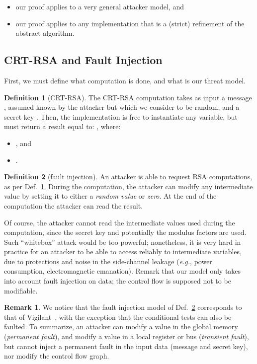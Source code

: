 \documentclass[10pt]{article}
\theoremstyle{definition}
\newtheorem{definition}{Definition}
\newtheorem{remark}{Remark}
\theoremstyle{theorem}
\newcommand{\eg}{\textit{e.g.}}
\begin{document}
\begin{itemize}
\item our proof applies to a very general attacker model, and
\item our proof applies to any implementation that is a (strict) refinement of the abstract algorithm.
\end{itemize}

\subsection{CRT-RSA and Fault Injection}
\label{sec-methods-rsa}

First, we must define what computation is done, and what is our threat model.

\begin{definition}[CRT-RSA]
The CRT-RSA computation takes as input a message ,
assumed known by the attacker but which we consider to be random,
and a secret key .
Then, the implementation is free to instantiate any variable, but must return a result equal to:
, where:
\begin{itemize}
\item , and
\item .
\end{itemize}
\label{def-crtrsa}
\end{definition}

\begin{definition}[fault injection]
An attacker is able to request RSA computations, as per Def.~\ref{def-crtrsa}.
During the computation, the attacker can modify any intermediate value by setting it to either a \emph{random value} or \emph{zero}.
At the end of the computation the attacker can read the result.
\label{def-faultinj}
\end{definition}
Of course, the attacker cannot read the intermediate values used during the computation,
since the secret key and potentially the modulus factors are used.
Such ``whitebox'' attack would be too powerful;
nonetheless, it is very hard in practice for an attacker to be able to access reliably to intermediate variables,
due to protections and noise in the side-channel leakage (\eg, power consumption, electromagnetic emanation).
Remark that our model only takes into account fault injection on data;
the control flow is supposed not to be modifiable.

\begin{remark}
We notice that the fault injection model of Def.~\ref{def-faultinj} corresponds to that of Vigilant~\cite{DBLP:conf/ches/Vigilant08}, with the exception that the conditional tests can also be faulted.
To summarize, an attacker can modify a value in the global memory (\emph{permanent fault}), and modify a value in a local register or bus (\emph{transient fault}),
but cannot inject a permanent fault in the input data (message and secret key), nor modify the control flow graph.
\end{remark}
\end{document}
